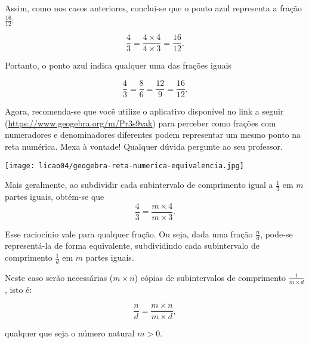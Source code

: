 \begin{refletindo*}
\begin{center}
\end{center}

Assim, como nos casos anteriores, conclui-se que o ponto azul representa a fração $\frac{16}{12}$:

$$\dfrac{4}{3} = \dfrac{4 \times 4}{4 \times 3} = \dfrac{16}{12}.$$

Portanto, o ponto azul indica qualquer uma das frações iguais

$$\dfrac{4}{3} = \dfrac{8}{6} = \dfrac{12}{9} = \dfrac{16}{12}.$$

Agora, recomenda-se que você utilize o aplicativo disponível no link a seguir (\url{https://www.geogebra.org/m/Pr3s9vak}) para perceber como frações com numeradores e denominadores diferentes podem representar um mesmo ponto  na reta numérica. Mexa à vontade! Qualquer dúvida pergunte ao seu professor.
\begin{center}
\texttt{[image: licao04/geogebra-reta-numerica-equivalencia.jpg]}
\end{center}

Mais geralmente, ao subdividir cada subintervalo de comprimento igual a $\frac{1}{3}$ em $m$ partes iguais, obtém-se que
$$\dfrac{4}{3} = \dfrac{m \times 4}{m \times 3}.$$

Esse raciocínio vale para qualquer fração. Ou seja, dada uma fração $\frac{n}{d}$, pode-se representá-la de forma equivalente, subdividindo cada subintervalo de comprimento $\frac{1}{d}$ em $m$ partes iguais.

Neste caso serão necessárias ($m \times n$) cópias de subintervalos de comprimento $\frac{1}{m \times d}$, isto é:

$$\dfrac{n}{d} = \dfrac{m \times n}{m \times d},$$

qualquer que seja o número natural $m > 0$.

\end{refletindo*}

